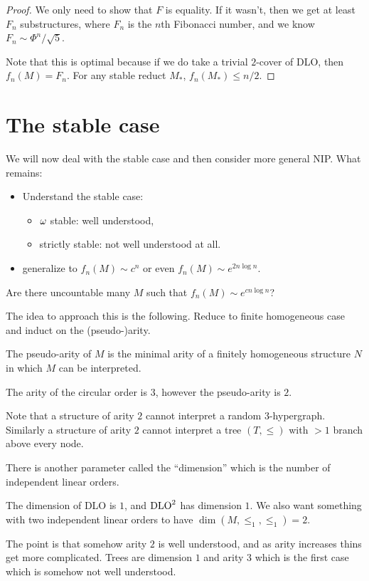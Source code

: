 \documentclass{amsart}
\begin{document}
\begin{proof}
We only need to show that $F$ is equality.
If it wasn't, then we get at least $F_n$ substructures, where $F_n$ is the $n$th Fibonacci
number, and we know $F_n\sim \Phi^n/\sqrt{5}$. 

Note that this is optimal because if we do take a trivial $2$-cover of DLO, then 
$f_n\left(M\right) = F_n$. For any stable reduct $M_*$, $f_n\left(M_*\right) \leq n/2$.
\end{proof}

\section{The stable case}

We will now deal with the stable case and then consider more general NIP.
What remains:
\begin{itemize}
\item Understand the stable case:
\begin{itemize}
\item $\omega$ stable: well understood,
\item strictly stable: not well understood at all.
\end{itemize}
\item generalize to $f_n\left(M\right)\sim c^n$ or even $f_n\left(M\right)\sim
e^{2n\log n}$.
\end{itemize}

\begin{qn}
Are there uncountable many $M$ such that $f_n\left(M\right)\sim e^{cn \log n}$?
\end{qn}

The idea to approach this is the following.
Reduce to finite homogeneous case and induct on the (pseudo-)arity.

\begin{defn}
The pseudo-arity of $M$ is the minimal arity of a finitely homogeneous structure $N$ in
which $M$ can be interpreted. 
\end{defn}

\begin{exm}
The arity of the circular order is $3$, however the pseudo-arity is $2$.
\end{exm}

Note that a structure of arity $2$ cannot interpret a random $3$-hypergraph.
Similarly a structure of arity $2$ cannot interpret a tree $\left(T , \leq\right)$ with
$>1$ branch above every node.

There is another parameter called the ``dimension'' which is the number of
independent linear orders. 
\begin{exm}
The dimension of DLO is $1$, and $\text{DLO}^2$ has dimension $1$.
We also want something with two independent linear orders to have $\dim\left(M , \leq_1,
\leq_1\right) = 2$.
\end{exm}

The point is that somehow arity $2$ is well understood, and as arity increases thins get
more complicated. Trees are dimension $1$ and arity $3$ which is the first case which is
somehow not well understood.
\end{document}
